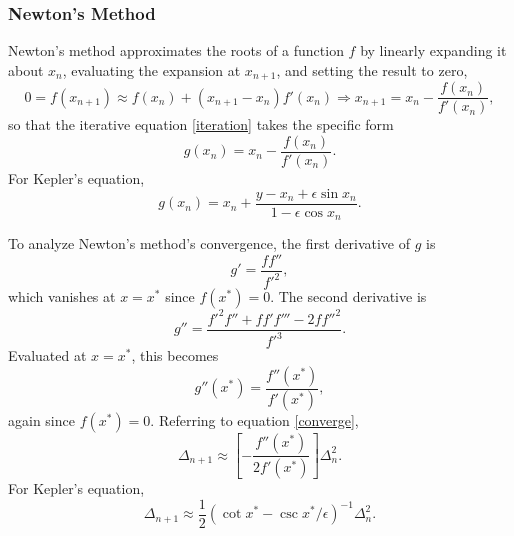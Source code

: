 \documentclass[10pt]{article}
\begin{document}
\subsubsection{Newton's Method}
\noindent Newton's method approximates the roots of a function $f$ by linearly expanding it about $x_n$, evaluating the expansion at $x_{n+1}$, and setting the result to zero,
\begin{equation}\label{linear}
0 = f\left(x_{n+1}\right) \approx f\left(x_n\right) + \left(x_{n+1} - x_n\right) f'\left(x_n\right) \Rightarrow x_{n+1} = x_n - \frac{f\left(x_n\right)}{f'\left(x_n\right)},
\end{equation}
\noindent so that the iterative equation \ref{iteration} takes the specific form
\begin{equation}\label{new}
g\left(x_n\right) = x_n - \frac{f\left(x_n\right)}{f'\left(x_n\right)}.
\end{equation}
\noindent For Kepler's equation,
\begin{equation*}
g\left(x_n\right) = x_n + \frac{y - x_n + \epsilon \sin x_n}{1-\epsilon \cos x_n}.
\end{equation*}

\noindent To analyze Newton's method's convergence, the first derivative of $g$ is
\begin{equation*}
g' = \frac{f f''}{f'^2},
\end{equation*}
\noindent which vanishes at $x=x^*$ since $f\left(x^*\right) = 0$. The second derivative is
\begin{equation*}
g'' =  \frac{f'^2 f'' + f f' f''' - 2 f f''^2}{f'^3}.
\end{equation*}
\noindent Evaluated at $x=x^*$, this becomes
\begin{equation*}
g''\left(x^*\right) =  \frac{f''\left(x^*\right)}{f'\left(x^*\right)},
\end{equation*}
\noindent again since $f\left(x^*\right) = 0$. Referring to equation \ref{converge},
\begin{equation*}
\Delta_{n+1} \approx \left[ - \frac{f''\left(x^*\right)}{2f'\left(x^*\right)} \right] \Delta_n^2.
\end{equation*}
\noindent For Kepler's equation,
\begin{equation*}
\Delta_{n+1} \approx \frac{1}{2} \left(\cot x^* - \csc x^* / \epsilon\right)^{-1} \Delta_n^2.
\end{equation*}
\end{document}
